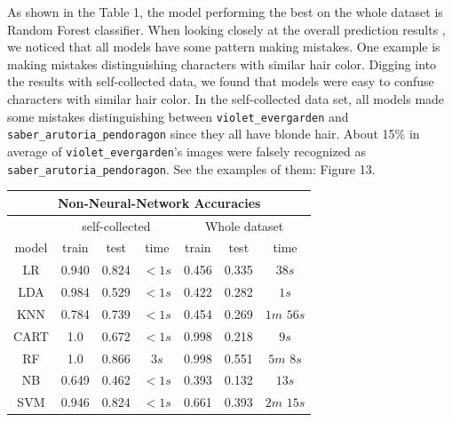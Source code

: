 \documentclass[11.5pt]{article}
\begin{document}
\begin{enumerate}
\begin{itemize}
            \begin{minipage}{0.45\textwidth}
                As shown in the Table 1, the model performing the best on the whole dataset is Random Forest classifier. When looking closely at the overall prediction results , we noticed that all models have some pattern making mistakes.
                One example is making mistakes distinguishing characters with similar hair color.
                Digging into the results with self-collected data, we found that models were easy to confuse characters with similar hair color.
                In the self-collected data set, all models made some mistakes distinguishing between \texttt{violet\_evergarden} and \texttt{saber\_arutoria\_pendoragon} since they all have blonde hair.
                About 15\% in average of \texttt{violet\_evergarden}'s images were falsely recognized as \texttt{saber\_arutoria\_pendoragon}.
                See the examples of them: Figure 13.
            \end{minipage}
            \begin{minipage}{0.3\textwidth}
                \begin{tabular}{|c|c|c|c|c|c|c|}
                    \multicolumn{7}{c}{\textbf{Non-Neural-Network Accuracies}}\\
                    \hline
                     & \multicolumn{3}{|c|}{self-collected} & \multicolumn{3}{|c|}{Whole dataset} \\ \hline
                    model & train & test & time & train & test & time \\ \hline
                    LR & 0.940 & 0.824 & $<1s$ & 0.456 & 0.335 & $38s$ \\ \hline
                    LDA  & 0.984 & 0.529 & $<1s$ & 0.422 & 0.282 & $1s$ \\ \hline
                    KNN & 0.784 & 0.739 & $<1s$ & 0.454 & 0.269 & $1m$ $56s$ \\ \hline
                    CART & 1.0 & 0.672 & $<1s$ & 0.998 & 0.218 & $9s$ \\ \hline
                    RF & 1.0 & 0.866 & $3s$ & 0.998 & 0.551 & $5m$ $8s$\\ \hline
                    NB & 0.649 & 0.462 & $<1s$ & 0.393 & 0.132 & $13s$ \\ \hline
                    SVM  & 0.946 & 0.824 & $<1s$ & 0.661 & 0.393 & $2m$ $15s$ \\ \hline
                \end{tabular}
            \end{minipage}
            

\end{itemize}
\end{enumerate}
\end{document}
